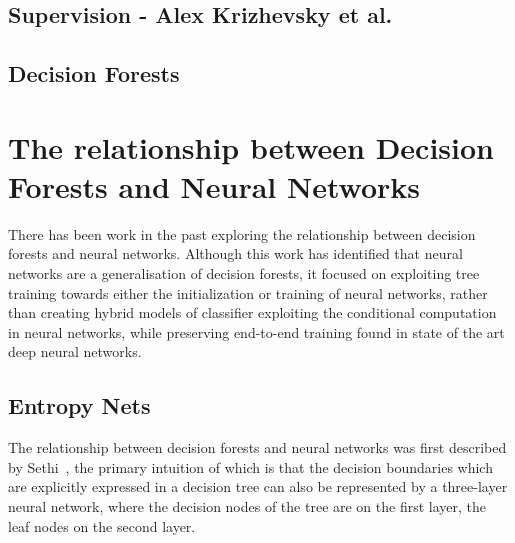 \documentclass[thesis]{subfiles}
\begin{document}


\subsection{Supervision - Alex Krizhevsky et al.}


\subsection{Decision Forests}

\section{The relationship between Decision Forests and Neural Networks}
There has been work in the past exploring the relationship between decision forests and neural networks. Although this work has identified that neural networks are a generalisation of decision forests, it focused on exploiting tree training towards either the initialization or training of neural networks, rather than creating hybrid models of classifier exploiting the conditional computation in neural networks, while preserving end-to-end training found in state of the art deep neural networks.

\subsection{Entropy Nets}
The relationship between decision forests and neural networks was first described by Sethi~\cite{Sethi1990}, the primary intuition of which is that the decision boundaries which are explicitly expressed in a decision tree can also be represented by a three-layer neural network, where the decision nodes of the tree are on the first layer, the leaf nodes on the second layer.
\end{document}
